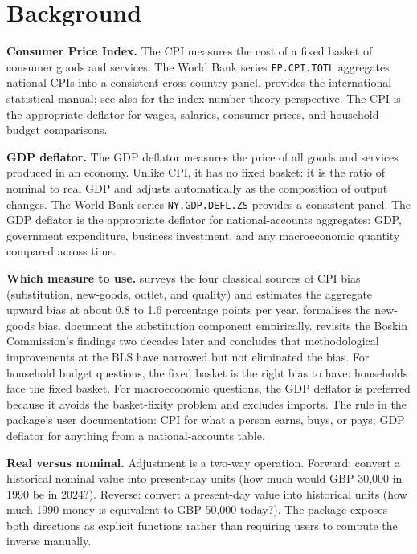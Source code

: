 \section{Background}\label{background}

\textbf{Consumer Price Index.} The CPI measures the cost of a fixed basket
of consumer goods and services. The World Bank series \texttt{FP.CPI.TOTL}
aggregates national CPIs into a consistent cross-country panel.
\citet{ilo2004cpi} provides the international statistical manual; see also
\citet{diewert1998index} for the index-number-theory perspective. The CPI
is the appropriate deflator for wages, salaries, consumer prices,
and household-budget comparisons.

\textbf{GDP deflator.} The GDP deflator measures the price of all goods
and services produced in an economy. Unlike CPI, it has no fixed
basket: it is the ratio of nominal to real GDP and adjusts
automatically as the composition of output changes. The World Bank
series \texttt{NY.GDP.DEFL.ZS} provides a consistent panel. The GDP
deflator is the appropriate deflator for national-accounts
aggregates: GDP, government expenditure, business investment, and
any macroeconomic quantity compared across time.

\textbf{Which measure to use.} \citet{hausman2003sources} surveys the four
classical sources of CPI bias (substitution, new-goods, outlet, and
quality) and estimates the aggregate upward bias at about 0.8 to
1.6 percentage points per year. \citet{feenstra1994new} formalises the
new-goods bias. \citet{broda2006globalization} document the substitution
component empirically. \citet{moulton2018measurement} revisits the Boskin
Commission's findings two decades later and concludes that
methodological improvements at the BLS have narrowed but not
eliminated the bias. For household budget questions, the fixed
basket is the right bias to have: households face the fixed
basket. For macroeconomic questions, the GDP deflator is preferred
because it avoids the basket-fixity problem and excludes imports.
The rule in the package's user documentation: CPI for what a
person earns, buys, or pays; GDP deflator for anything from a
national-accounts table.

\textbf{Real versus nominal.} Adjustment is a two-way operation.
Forward: convert a historical nominal value into present-day units
(how much would GBP 30,000 in 1990 be in 2024?). Reverse: convert
a present-day value into historical units (how much 1990 money is
equivalent to GBP 50,000 today?). The package exposes both
directions as explicit functions rather than requiring users to
compute the inverse manually.

